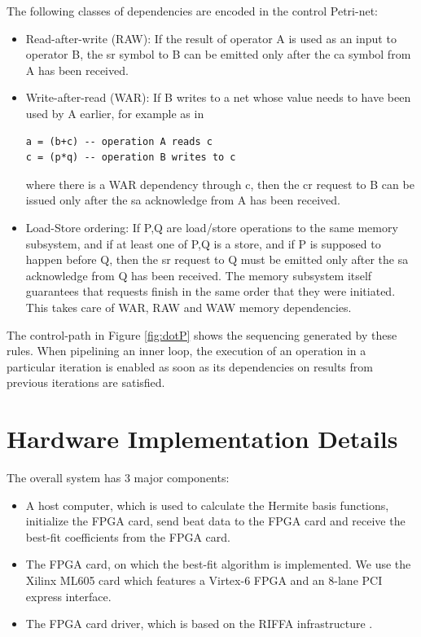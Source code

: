 \documentclass[conference]{IEEEtran}
\begin{document}
The following classes of dependencies are
encoded in the control Petri-net:
\begin{itemize}
\item Read-after-write (RAW):  If the result of operator A is used
as an input to operator B, the sr symbol to B can be emitted only after
the ca symbol from A has been received.
\item Write-after-read (WAR): If B writes to a net whose value needs
to have been used by A earlier, for example as in
\begin{verbatim}
a = (b+c) -- operation A reads c
c = (p*q) -- operation B writes to c
\end{verbatim}
where there is a WAR dependency through c,
 then the cr request to B can be
issued only after the sa acknowledge from A has been received.
\item Load-Store ordering:  If P,Q are load/store operations
to the same memory subsystem, and if at least one of P,Q is a
store, and if P is supposed to happen before Q,  then the sr request
to Q must be emitted only after the sa acknowledge from Q
has been received.  The memory subsystem itself guarantees
that requests finish in the same order that they were
initiated.  This takes care of WAR, RAW and WAW memory
dependencies.
\end{itemize}

The control-path in Figure \ref{fig:dotP} shows the sequencing
generated by these rules.  When pipelining an inner loop,
the execution of an operation in a particular iteration is
enabled as soon as its dependencies on results from previous
iterations are satisfied.  


\section{Hardware Implementation Details}\label{s:implementation}

The overall system has 3 major components:
\begin{itemize}
\item A host computer, which is used to calculate the Hermite basis functions,
initialize the FPGA card, send beat data to the FPGA card and receive
the best-fit coefficients from the FPGA card.
\item The FPGA card, on which the best-fit algorithm is implemented.   We use the
Xilinx ML605 card which features a Virtex-6 FPGA and an 8-lane PCI express interface.
\item The FPGA card driver, which is based on the RIFFA infrastructure \cite{c:jacobsen13}. 
\end{itemize}
\end{document}

